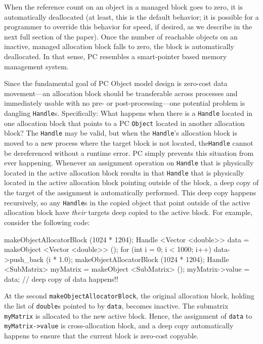 When the reference count on an object in a managed block goes to zero, it is automatically
deallocated (at least, this is the default behavior; it is possible for a programmer to override this behavior for speed, if desired, as we describe in the
next full section of the paper).  
Once the number of reachable objects on an inactive, managed allocation block falls to zero, the block is automatically deallocated.  
In that sense, PC resembles a smart-pointer based memory management system.  

Since the fundamental goal of PC Object model design is 
zero-cost data movement---an allocation block should be transferable across processes and immediately usable with no pre- or post-processing---one
potential problem is dangling \texttt{Handle}s.  Specifically: What happens when there is a \texttt{Handle} located in one allocation block that points to a PC
\texttt{Object} located in another allocation block?  The \texttt{Handle} may be valid, but when the \texttt{Handle}'s allocation block is moved to a new process where
the target block is not located, the\texttt{Handle} cannot be dereferenced without a runtime error. 
PC simply prevents this situation from ever happening. Whenever an assignment operation on \texttt{Handle} that is physically located
in the active allocation block results in that
\texttt{Handle} that is physically located in the active allocation block pointing outside of the block, a deep copy of the target of the assignment
is automatically performed.  This deep copy happens recursively, so any \texttt{Handle}s in the copied object that point outside of the active allocation block
have \emph{their} targets deep copied to the active block.  For example, consider the following code:

\begin{code}
makeObjectAllocatorBlock (1024 * 1204);
Handle <Vector <double>> data = makeObject <Vector <double>> ();
for (int i = 0; i < 1000; i++)
     data->push_back (i * 1.0);
makeObjectAllocatorBlock (1024 * 1204); 
Handle <SubMatrix> myMatrix = makeObject <SubMatrix> ();
myMatrix->value = data; // deep copy of data happens!!
\end{code}

At the second \texttt{makeObjectAllocatorBlock}, the original allocation block, holding the list of \texttt{double}s pointed to by \texttt{data}, becomes
inactive.  The submatrix \texttt{myMatrix} is allocated to the new active block.  
Hence, the assignment of \texttt{data} to \texttt{myMatrix->value} is cross-allocation block, and a deep copy automatically happens to ensure that
the current block is zero-cost copyable.  


